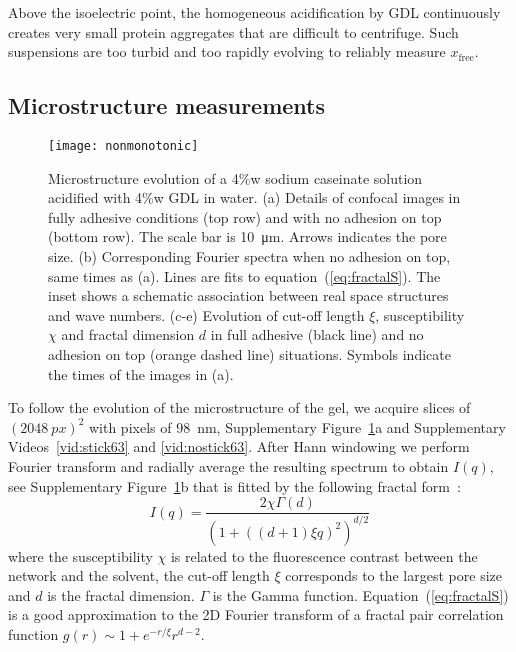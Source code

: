 \documentclass[twocolumn,superscriptaddress,showpacs,preprintnumbers,
amsmath,amssymb,prl]{revtex4-1}
\begin{document}
Above the isoelectric point, the homogeneous acidification by GDL continuously creates very small protein aggregates that are difficult to centrifuge. Such suspensions are too turbid and too rapidly evolving to reliably measure $x_\text{free}$.

\subsection*{Microstructure measurements}

\begin{figure}
	\texttt{[image: nonmonotonic]}%
	\caption{Microstructure evolution of a 4\%w sodium caseinate solution acidified with 4\%w GDL in water. (a) Details of confocal images in fully adhesive conditions (top row) and with no adhesion on top (bottom row). The scale bar is \SI{10}{\micro\metre}. Arrows indicates the pore size. (b) Corresponding Fourier spectra when no adhesion on top, same times as (a). Lines are fits to equation~(\ref{eq:fractalS}). The inset shows a schematic association between real space structures and wave numbers. (c-e) Evolution of cut-off length $\xi$, susceptibility $\chi$ and fractal dimension $d$ in full adhesive (black line) and no adhesion on top (orange dashed line) situations. Symbols indicate the times of the images in (a).}%
	\label{fig:nonmonotonic}%
\end{figure}

To follow the evolution of the microstructure of the gel, we acquire slices of $(\SI{2048}{px})^2$ with pixels of \SI{98}{\nano\metre}, Supplementary Figure~\ref{fig:nonmonotonic}a and Supplementary Videos~\ref{vid:stick63} and \ref{vid:nostick63}. After Hann windowing we perform Fourier transform and radially average the resulting spectrum to obtain $I(q)$, see Supplementary Figure~\ref{fig:nonmonotonic}b that is fitted by the following fractal form~\cite{VanDijk1986}:
\begin{equation}
I(q) = \frac{2\chi\Gamma(d)}{\left(1+\left((d+1)\xi q\right)^2\right)^{d/2}}
\label{eq:fractalS}
\end{equation}
where the susceptibility $\chi$ is related to the fluorescence contrast between the network and the solvent, the cut-off length $\xi$ corresponds to the largest pore size and $d$ is the fractal dimension. $\Gamma$ is the Gamma function. Equation~(\ref{eq:fractalS}) is a good approximation to the 2D Fourier transform of a fractal pair correlation function $g(r) \sim 1+ e^{-r/\xi} r^{d-2}$.
\end{document}
